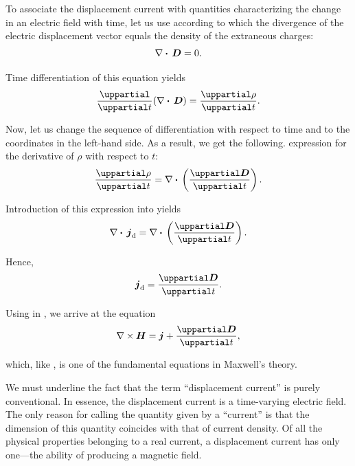 \noindent
To associate the displacement current with quantities characterizing the change in an electric field with time, let us use  according to which the divergence of the electric displacement vector equals the density of the extraneous charges:
\begin{equation*}
    \nabla\boldsymbol{\cdot}\,\boldsymbol{D} = 0.
\end{equation*}

\noindent
Time differentiation of this equation yields
\begin{equation*}
    \diffpartial{}{t} (\divop{\vec{D}}) = \diffpartial{\rho}{t}.
\end{equation*}

\noindent
Now, let us change the sequence of differentiation with respect to time and to the coordinates in the left-hand side.
As a result, we get the following. expression for the derivative of $\rho$ with respect to $t$:
\begin{equation*}
    \diffpartial{\rho}{t} = \divop{\parenthesis{ \diffpartial{\vec{D}}{t} }}.
\end{equation*}

\noindent
Introduction of this expression into  yields
\begin{equation*}
    \divop{\ab{\vec{j}}{d}} = \divop{\parenthesis{ \diffpartial{\vec{D}}{t} }}.
\end{equation*}

\noindent
Hence,
\begin{equation}\label{eq:9_12}
    \ab{\vec{j}}{d} = \diffpartial{\vec{D}}{t}.
\end{equation}

Using  in , we arrive at the equation
\begin{equation}\label{eq:9_13}
    \curlop{\vec{H}} = \vec{j} + \diffpartial{\vec{D}}{t},
\end{equation}

\noindent
which, like , is one of the fundamental equations in Maxwell's theory.

We must underline the fact that the term ``displacement current'' is purely conventional.
In essence, the displacement current is a time-varying electric field.
The only reason for calling the quantity given by  a ``current'' is that the dimension of this quantity coincides with that of current density.
Of all the physical properties belonging to a real current, a displacement current has only one---the
ability of producing a magnetic field.

